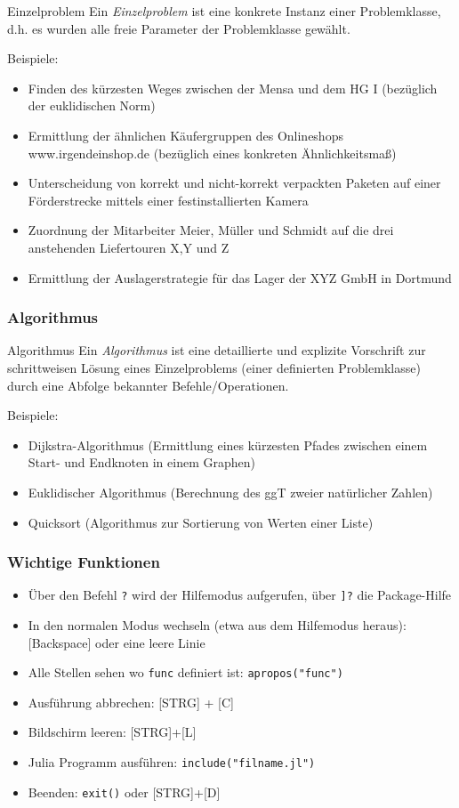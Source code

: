 \begin{frame}
\begin{block}{Einzelproblem}
Ein \textit{Einzelproblem} ist eine konkrete Instanz einer Problemklasse, d.h. es wurden alle freie Parameter der Problemklasse gewählt.
\end{block}
Beispiele:\pause
\begin{itemize}
\item Finden des kürzesten Weges zwischen der Mensa und dem HG I (bezüglich der euklidischen Norm)\pause
\item Ermittlung der ähnlichen Käufergruppen des Onlineshops www.irgendeinshop.de (bezüglich eines konkreten Ähnlichkeitsmaß)\pause
\item Unterscheidung von korrekt und nicht-korrekt verpackten Paketen auf einer Förderstrecke mittels einer festinstallierten Kamera\pause
\item Zuordnung der Mitarbeiter Meier, Müller und Schmidt auf die drei anstehenden Liefertouren X,Y und Z\pause
\item Ermittlung der Auslagerstrategie für das Lager der XYZ GmbH in Dortmund\pause
\end{itemize}
\end{frame}
\begin{frame}
\frametitle{Algorithmus}
\begin{block}{Algorithmus}
Ein \textit{Algorithmus} ist eine detaillierte und explizite Vorschrift zur schrittweisen Lösung eines Einzelproblems (einer definierten Problemklasse) durch eine Abfolge bekannter Befehle/Operationen.
\end{block}
Beispiele:\pause
\begin{itemize}
\item Dijkstra-Algorithmus (Ermittlung eines kürzesten Pfades zwischen einem Start- und Endknoten in einem Graphen)\pause
\item Euklidischer Algorithmus (Berechnung des ggT zweier natürlicher Zahlen)\pause
\item Quicksort (Algorithmus zur Sortierung von Werten einer Liste)
\end{itemize}
\end{frame}
\begin{frame}[fragile]
\frametitle{Wichtige Funktionen}
\begin{itemize}[<+->]
\item Über den Befehl \verb+?+ wird der Hilfemodus aufgerufen, über \verb+]?+ die Package-Hilfe
\item In den normalen Modus wechseln (etwa aus dem Hilfemodus heraus): [Backspace] oder eine leere Linie
\item Alle Stellen sehen wo \verb+func+ definiert ist: \verb+apropos("func")+
\item Ausführung abbrechen: [STRG] + [C]
\item Bildschirm leeren: [STRG]+[L]
\item Julia Programm ausführen: \verb+include("filname.jl")+
\item Beenden: \verb+exit()+ oder [STRG]+[D]
\end{itemize}
\end{frame}
